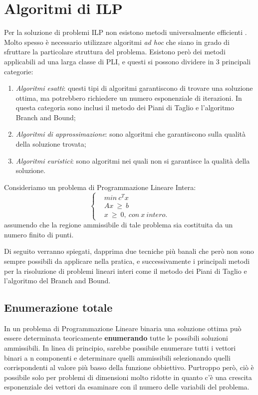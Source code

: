 \section{Algoritmi di ILP}
Per la soluzione di problemi ILP non esistono metodi universalmente efficienti \cite{ref:IntroLinearOptimization}. Molto spesso è necessario utilizzare algoritmi \textit{ad hoc} che siano in grado di sfruttare la particolare struttura del problema.
Esistono però dei metodi applicabili ad una larga classe di PLI, e questi si possono dividere in 3 principali categorie:
\begin{enumerate}
\item \textit{Algoritmi esatti}: questi tipi di algoritmi garantiscono di trovare una soluzione ottima, ma potrebbero richiedere un numero esponenziale di iterazioni. In questa categoria sono inclusi il metodo dei Piani di Taglio e l'algoritmo Branch and Bound;
\item \textit{Algoritmi di approssimazione}: sono algoritmi che garantiscono sulla qualità della soluzione trovata;
\item \textit{Algoritmi euristici}: sono algoritmi nei quali non si garantisce la qualità della soluzione.
\end{enumerate} 

Consideriamo un problema di Programmazione Lineare Intera:
\begin{equation}
\label{eq:progLinInt}
\begin{cases}
& min ~ c^T x \\
& Ax ~ \geq ~ b \\
& x ~ \geq ~ 0, ~ con ~ x ~ intero.
\end{cases}
\end{equation}
assumendo che la regione ammissibile di tale problema sia costituita da un numero finito di punti.

Di seguito verranno spiegati, dapprima due tecniche più banali che però non sono sempre possibili da applicare nella pratica, e successivamente i principali metodi per la risoluzione di problemi lineari interi come il metodo dei Piani di Taglio e l'algoritmo del Branch and Bound.

\subsection{Enumerazione totale}
In un problema di Programmazione Lineare binaria una soluzione ottima può essere determinata teoricamente \textbf{enumerando} tutte le possibili soluzioni ammissibili. In linea di principio, sarebbe possibile enumerare tutti i vettori binari a n componenti e determinare quelli ammissibili selezionando quelli corrispondenti al valore più basso della funzione obbiettivo.
Purtroppo però, ciò è possibile solo per problemi di dimensioni molto ridotte in quanto c'è una crescita esponenziale dei vettori da esaminare con il numero delle variabili del problema.

